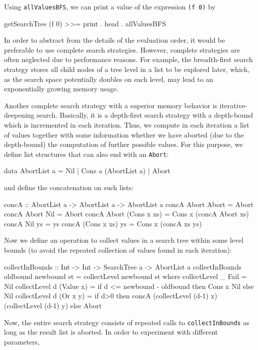 \documentclass[english]{lni}
\newcommand{\code}[1]{\texttt{\small{}#1}}
\begin{document}
Using \code{allValuesBFS}, we can print a value
of the expression \code{(f 0)} by
%
\begin{curry}
getSearchTree (f 0) >>= print . head . allValuesBFS
\end{curry}
%
In order to abstract from the details of the evaluation order,
it would be preferable to use complete search strategies.
However, complete strategies are often neglected due to performance reasons.
For example, the breadth-first search strategy stores all child nodes 
of a tree level in a list to be explored later, which, as the search space
potentially doubles on each level, may lead to an exponentially
growing memory usage.

Another complete search strategy with a superior memory behavior
is iterative-deepening search.
Basically, it is a depth-first search strategy with a depth-bound
which is incremented in each iteration.
Thus, we compute in each iteration a list of values
together with some information whether we have aborted
(due to the depth-bound) the computation of further possible values.
For this purpose, we define list structures that can also end
with an \code{Abort}:
%
\begin{curry}
data AbortList a = Nil | Cons a (AbortList a) | Abort
\end{curry}
%
and define the concatenation on such lists:
%
\begin{curry}
concA :: AbortList a -> AbortList a -> AbortList a
concA Abort       Abort       = Abort
concA Abort       Nil         = Abort
concA Abort       (Cons x xs) = Cons x (concA Abort xs)
concA Nil         ys          = ys
concA (Cons x xs) ys          = Cons x (concA xs ys)
\end{curry}
%
Now we define an operation to collect values in a search tree
within some level bounds (to avoid the repeated collection
of values found in each iteration):
%
\begin{curry}
collectInBounds :: Int -> Int -> SearchTree a -> AbortList a
collectInBounds oldbound newbound st = collectLevel newbound st
 where
  collectLevel _ Fail      = Nil
  collectLevel d (Value x) = if d <= newbound - oldbound
                             then Cons x Nil
                             else Nil
  collectLevel d (Or x y)  =
    if d>0
    then concA (collectLevel (d-1) x) (collectLevel (d-1) y)
    else Abort
\end{curry}
%
Now, the entire search strategy consists of
repeated calls to \code{collectInBounds} as long as the result list
is aborted. In order to experiment with different parameters,
\end{document}
